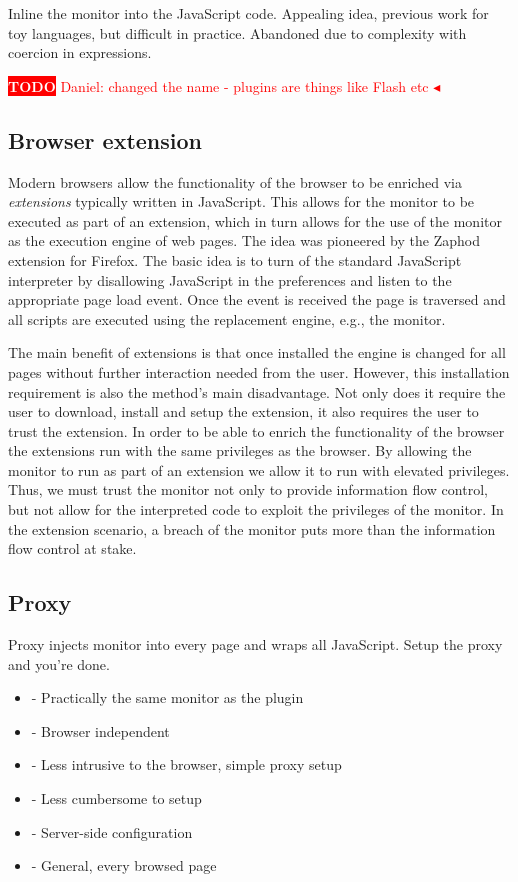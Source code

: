 \documentclass{llncs}
\newcommand{\todo}[1]{\colorbox{red}{\textcolor{white}{\sffamily\bfseries\scriptsize TODO}} \textcolor{red}{#1} \textcolor{red}{$\blacktriangleleft$}}
\begin{document}
Inline the monitor into the JavaScript code. Appealing idea, previous work for 
toy languages, but difficult in practice. Abandoned due to complexity with 
coercion in expressions.


\todo{Daniel: changed the name - plugins are things like Flash etc}
\subsection{Browser extension}
%
Modern browsers allow the functionality of the browser to be enriched via
\emph{extensions} typically written in JavaScript. This allows for the monitor
to be executed as part of an extension, which in turn allows for the use of the
monitor as the execution engine of web pages. The idea was pioneered by the
Zaphod\cite{Zaphod} extension for Firefox.  The basic idea is to turn of the
standard JavaScript interpreter by disallowing JavaScript in the preferences
and listen to the appropriate page load event. Once the event is received the
page is traversed and all scripts are executed using the replacement engine,
e.g., the monitor. 

The main benefit of extensions is that once installed the engine is changed for
all pages without further interaction needed from the user. However, this
installation requirement is also the method's main disadvantage. Not only does
it require the user to download, install and setup the extension, it also 
requires the user to trust the extension. In order to be able to enrich the 
functionality of the browser the extensions run with the same privileges as the
browser. By allowing the monitor to run as part of an extension we allow it to
run with elevated privileges. Thus, we must trust the
monitor not only to provide information flow control, but not allow for 
the interpreted code to exploit the privileges of the monitor. In the extension
scenario, a breach of the monitor puts more than the information flow control
at stake.


\subsection{Proxy}

Proxy injects monitor into every page and wraps all JavaScript. Setup the proxy 
and you're done.
\begin{itemize}
\item- Practically the same monitor as the plugin
\item- Browser independent
\item- Less intrusive to the browser, simple proxy setup
\item- Less cumbersome to setup
\item- Server-side configuration
\item- General, every browsed page
\end{itemize}
\end{document}
